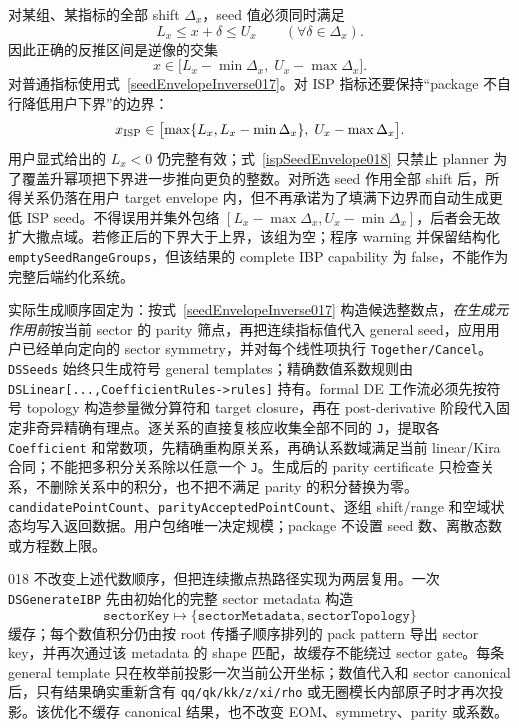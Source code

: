 ﻿\documentclass[a4paper,11pt]{article}
\begin{document}
对某组、某指标的全部 shift $\Delta_x$，seed 值必须同时满足
\begin{equation}
 L_x\leq x+\delta\leq U_x\qquad (\forall\delta\in\Delta_x).
\end{equation}
因此正确的反推区间是逆像的交集
\begin{equation}
 x\in\bigl[L_x-\min\Delta_x,\;U_x-\max\Delta_x\bigr].
 \label{seedEnvelopeInverse017}
\end{equation}
对普通指标使用式~\eqref{seedEnvelopeInverse017}。对 ISP 指标还要保持“package 不自行降低用户下界”的边界：
\begin{equation}
 x_{\rm ISP}\in\bigl[\max\{L_x,L_x-\min\Delta_x\},\;U_x-\max\Delta_x\bigr].
 \label{ispSeedEnvelope018}
\end{equation}
用户显式给出的 $L_x<0$ 仍完整有效；式~\eqref{ispSeedEnvelope018} 只禁止 planner 为了覆盖升幂项把下界进一步推向更负的整数。对所选 seed 作用全部 shift 后，所得关系仍落在用户 target envelope 内，但不再承诺为了填满下边界而自动生成更低 ISP seed。不得误用并集外包络 $[L_x-\max\Delta_x,U_x-\min\Delta_x]$，后者会无故扩大撒点域。若修正后的下界大于上界，该组为空；程序 warning 并保留结构化 \texttt{emptySeedRangeGroups}，但该结果的 complete IBP capability 为 false，不能作为完整后端约化系统。

实际生成顺序固定为：按式~\eqref{seedEnvelopeInverse017} 构造候选整数点，\emph{在生成元作用前}按当前 sector 的 parity 筛点，再把连续指标值代入 general seed，应用用户已经单向定向的 sector symmetry，并对每个线性项执行 \texttt{Together/Cancel}。\texttt{DSSeeds} 始终只生成符号 general templates；精确数值系数规则由 \texttt{DSLinear[...,CoefficientRules->rules]} 持有。formal DE 工作流必须先按符号 topology 构造参量微分算符和 target closure，再在 post-derivative 阶段代入固定非奇异精确有理点。逐关系的直接复核应收集全部不同的 \texttt{J}，提取各 \texttt{Coefficient} 和常数项，先精确重构原关系，再确认系数域满足当前 linear/Kira 合同；不能把多积分关系除以任意一个 \texttt{J}。生成后的 parity certificate 只检查关系，不删除关系中的积分，也不把不满足 parity 的积分替换为零。\texttt{candidatePointCount}、\texttt{parityAcceptedPointCount}、逐组 shift/range 和空域状态均写入返回数据。用户包络唯一决定规模；package 不设置 seed 数、离散态数或方程数上限。

018 不改变上述代数顺序，但把连续撒点热路径实现为两层复用。一次 \texttt{DSGenerateIBP} 先由初始化的完整 sector metadata 构造
\begin{equation}
 \texttt{sectorKey}\longmapsto\{\texttt{sectorMetadata},\texttt{sectorTopology}\}
\end{equation}
缓存；每个数值积分仍由按 root 传播子顺序排列的 pack pattern 导出 sector key，并再次通过该 metadata 的 shape 匹配，故缓存不能绕过 sector gate。每条 general template 只在枚举前投影一次当前公开坐标；数值代入和 sector canonical 后，只有结果确实重新含有 \texttt{qq/qk/kk/z/xi/rho} 或无圈模长内部原子时才再次投影。该优化不缓存 canonical 结果，也不改变 EOM、symmetry、parity 或系数。
\end{document}
